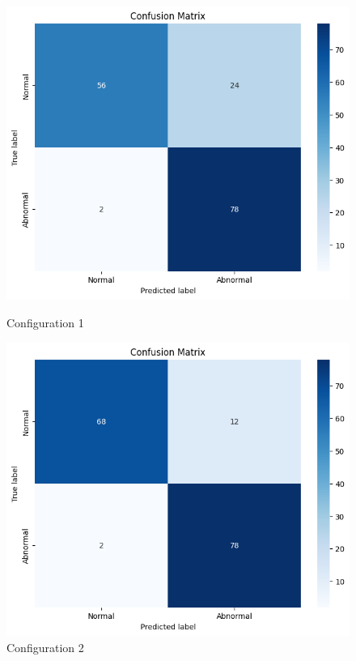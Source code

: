 \iffalse
\begin{figure}[ht!]
    \centering  
    \begin{minipage}{0.6\textwidth}
        \centering
        \includegraphics[width=\textwidth]{Rohit_Master_Thesis//Images/patchcore_config1_confusion_matrix.jpg} %
        \caption{Configuration 1}
    \end{minipage}
    
    \vspace{0.5cm} %
    
    \begin{minipage}{0.6\textwidth}
        \centering
        \includegraphics[width=\textwidth]{Rohit_Master_Thesis//Images/patchcore_config2_confusion_matrix.jpg} %
        \caption{Configuration 2}
    \end{minipage}
    

\end{figure}
